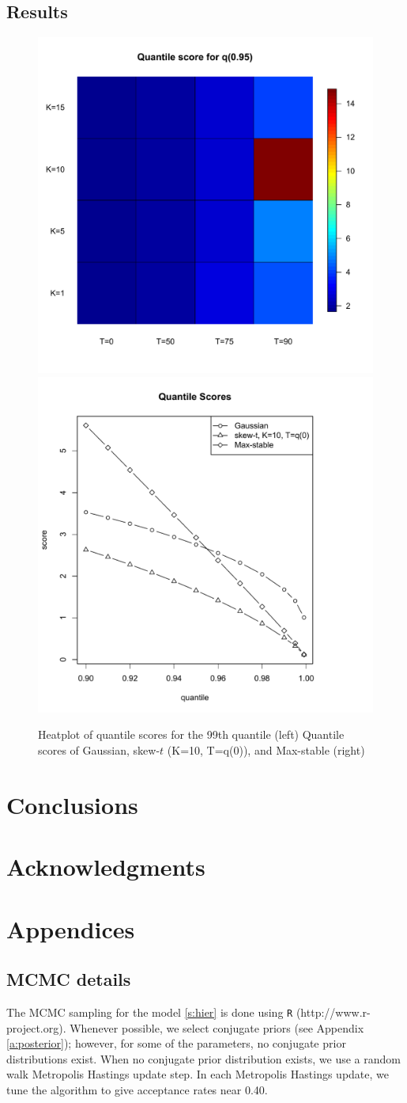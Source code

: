 \documentclass[11pt]{article}
\begin{document}
\subsection{Results}\label{s:results}
\begin{figure}
  \includegraphics[width=0.5\linewidth]{plots/heatplot.pdf}
  \includegraphics[width=0.5\linewidth]{plots/qscore-best.pdf}
  \caption{Heatplot of quantile scores for the 99th quantile (left) Quantile scores of Gaussian, skew-$t$ (K=10, T=q(0)), and Max-stable (right)}
  \label{fig:heatplot}
\end{figure}

\section{Conclusions}\label{s:con}

\section*{Acknowledgments}

\appendix
\section{Appendices}
\subsection{MCMC details} \label{a:mcmc}
The MCMC sampling for the model \ref{s:hier} is done using {\tt R} (http://www.r-project.org). Whenever possible, we select conjugate priors (see Appendix \ref{a:posterior}); however, for some of the parameters, no conjugate prior distributions exist.
When no conjugate prior distribution exists, we use a random walk Metropolis Hastings update step.
In each Metropolis Hastings update, we tune the algorithm to give acceptance rates near 0.40.
\end{document}
